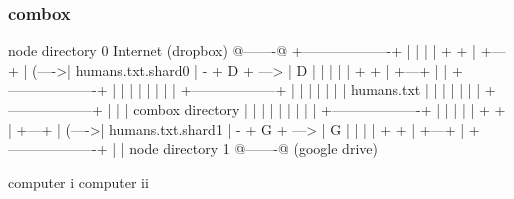 \begin{frame}[fragile]
  \frametitle{combox}

  {\tiny
  \begin{semiverbatim}

         node directory 0                Internet
         (dropbox)                       @-------@
        +-------------------+            |       |
        |                   |    + +     | +---+ |
  (---->| humans.txt.shard0 | - + D + ---> | D | |
  |     |                   |    + +     | +---+ |
  |     +-------------------+            |       |
  |                                      |       |
  |                                      |       |
 +------------------+                    |       |
 |                  |                    |       |
 |  humans.txt      |                    |       |
 |                  |                    |       |
 +------------------+                    |       |
  |  combox directory                    |       |
  |                                      |       |
  |                                      |       |
  |     +-------------------+            |       |
  |     |                   |    + +     | +---+ |
  (---->| humans.txt.shard1 | - + G + ---> | G | |
        |                   |    + +     | +---+ |
        +-------------------+            |       |
         node directory 1                @-------@
         (google drive)

  computer i                                                                    computer ii
  \end{semiverbatim}
  }

\end{frame}


